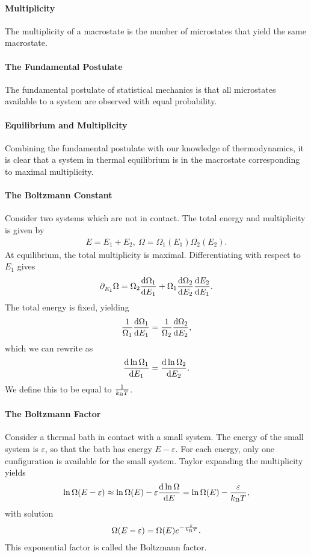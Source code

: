 \paragraph{Multiplicity}
The multiplicity of a macrostate is the number of microstates that yield the same macrostate.

\paragraph{The Fundamental Postulate}
The fundamental postulate of statistical mechanics is that all microstates available to a system are observed with equal probability.

\paragraph{Equilibrium and Multiplicity}
Combining the fundamental postulate with our knowledge of thermodynamics, it is clear that a system in thermal equilibrium is in the macrostate corresponding to maximal multiplicity.

\paragraph{The Boltzmann Constant}
Consider two systems which are not in contact. The total energy and multiplicity is given by
\begin{align*}
	E = E_{1} + E_{2},\ \Omega = \Omega_{1}(E_{1})\Omega_{2}(E_{2}).
\end{align*}
At equilibrium, the total multiplicity is maximal. Differentiating with respect to $E_{1}$ gives
\begin{align*}
	\partial_{E_{1}}^{}\Omega = \Omega_{2}\dv{\Omega_{1}}{E_{1}} + \Omega_{1}\dv{\Omega_{2}}{E_{2}}\dv{E_{2}}{E_{1}}.
\end{align*}
The total energy is fixed, yielding
\begin{align*}
	\frac{1}{\Omega_{1}}\dv{\Omega_{1}}{E_{1}} = \frac{1}{\Omega_{2}}\dv{\Omega_{2}}{E_{2}},
\end{align*}
which we can rewrite as
\begin{align*}
	\dv{\ln{\Omega_{1}}}{E_{1}} = \dv{\ln{\Omega_{2}}}{E_{2}}.
\end{align*}
We define this to be equal to $\frac{1}{k_{\text{B}} T}$.

\paragraph{The Boltzmann Factor}
Consider a thermal bath in contact with a small system. The energy of the small system is $\varepsilon$, so that the bath has energy $E - \varepsilon$. For each energy, only one cunfiguration is available for the small system. Taylor expanding the multiplicity yields
\begin{align*}
	\ln{\Omega(E - \varepsilon)} \approx \ln{\Omega(E)} - \varepsilon\dv{\ln{\Omega}}{E} = \ln{\Omega(E)} - \frac{\varepsilon}{k_{\text{B}} T},
\end{align*}
with solution
\begin{align*}
	\Omega(E - \varepsilon) = \Omega(E)e^{-\frac{\varepsilon}{k_{\text{B}} T}}.
\end{align*}
This exponential factor is called the Boltzmann factor.

